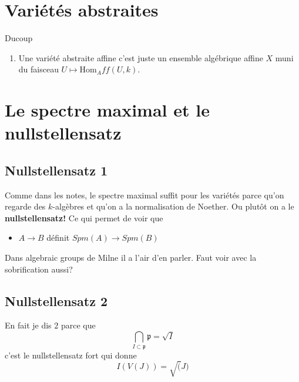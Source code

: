 \documentclass[a4paper,12pt]{book}
\newcommand{\Hom}{\textrm{Hom}}
\newcommand{\p}{\mathfrak{p}}
\theoremstyle{plain}
\theoremstyle{definition}
\theoremstyle{remark}
\begin{document}
\chapter{Variétés abstraites}
Ducoup 
\begin{enumerate}
    \item Une variété abstraite affine c'est juste un ensemble algébrique
	affine $X$ muni du faisceau $U\mapsto \Hom_Aff(U, k)$.
\end{enumerate}

\chapter{Le spectre maximal et le nullstellensatz}
\section{Nullstellensatz 1}
Comme dans les notes, le spectre maximal suffit pour 
les variétés parce qu'on regarde des $k$-algèbres et
qu'on a la normalisation de Noether. Ou plutôt on a le 
\textbf{nullstellensatz!} Ce qui permet de voir que 
\begin{itemize}
    \item $A\to B$ définit $Spm(A)\to Spm(B)$
\end{itemize}
Dans algebraic groups de Milne il a l'air d'en parler. Faut voir
avec la sobrification aussi?
\section{Nullstellensatz 2}
En fait je dis $2$ parce que 
\[\bigcap_{I\subset \p} \p =\sqrt{I}\]
c'est le nullstellensatz fort qui donne 
\[I(V(J))=\sqrt(J)\]

\printbibliography
\end{document}
